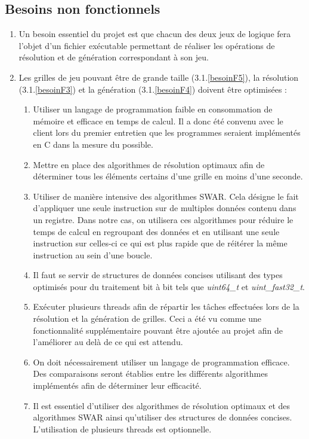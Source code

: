 \documentclass[12pt]{article}
\begin{document}
\subsection{Besoins non fonctionnels}
\begin{enumerate}
\itemsep1em

\item  Un besoin essentiel du projet est que chacun des deux jeux de logique fera l'objet d'un fichier exécutable permettant de réaliser les opérations de résolution et de génération correspondant à son jeu.

\item \label {besoinNF2} Les grilles de jeu pouvant être de grande taille (3.1.\ref{besoinF5}), la résolution (3.1.\ref{besoinF3}) et la génération (3.1.\ref{besoinF4}) doivent être optimisées : 
\begin{enumerate}
\item Utiliser un langage de programmation faible en consommation de mémoire et efficace en temps de calcul. Il a donc été convenu avec le client lors du premier entretien que les programmes seraient implémentés en C dans la mesure du possible.
\item Mettre en place des algorithmes de résolution optimaux afin de déterminer tous les éléments certains d'une grille en moins d'une seconde.
\item \label {besoinNF2c}Utiliser de manière intensive des algorithmes SWAR. Cela désigne le fait d'appliquer une seule instruction sur de multiples données contenu dans un registre. Dans notre cas, on utilisera ces algorithmes pour réduire le temps de calcul en regroupant des données et en utilisant une seule instruction sur celles-ci ce qui est plus rapide que de réitérer la même instruction au sein d'une boucle.
\item Il faut se servir de structures de données concises utilisant des types optimisés pour du traitement bit à bit tels que \textit{uint64\_t} et \textit{uint\_fast32\_t}. 
\item \label {besoinNF2e}Exécuter plusieurs threads afin de répartir les tâches effectuées lors de la résolution et la génération de grilles. Ceci a été vu comme une fonctionnalité supplémentaire pouvant être ajoutée au projet afin de l'améliorer au delà de ce qui est attendu.
\item On doit nécessairement utiliser un langage de programmation efficace. Des comparaisons seront établies entre les différents algorithmes implémentés afin de déterminer leur efficacité. 
\item Il est essentiel d'utiliser des algorithmes de résolution optimaux et des algorithmes SWAR ainsi qu'utiliser des structures de données concises. L'utilisation de plusieurs threads est optionnelle.
\end{enumerate}


\end{enumerate}
\end{document}

